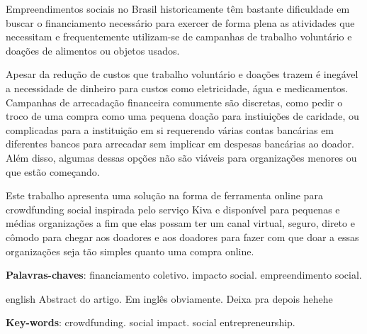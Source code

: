 \begin{resumo}
Empreendimentos sociais no Brasil historicamente têm bastante dificuldade em buscar o financiamento necessário para exercer de forma plena as atividades que necessitam e frequentemente utilizam-se de campanhas de trabalho voluntário e doações de alimentos ou objetos usados.
  
Apesar da redução de custos que trabalho voluntário e doações trazem é inegável a necessidade de dinheiro para custos como eletricidade, água e medicamentos. Campanhas de arrecadação financeira comumente são discretas, como pedir o troco de uma compra como uma pequena doação para instiuições de caridade, ou complicadas para a instituição em si requerendo várias contas bancárias em diferentes bancos para arrecadar sem implicar em despesas bancárias ao doador. Além disso, algumas dessas opções não são viáveis para organizações menores ou que estão começando.

Este trabalho apresenta uma solução na forma de ferramenta online para crowdfunding social inspirada pelo serviço Kiva \cite{flannery2007kiva} e disponível para pequenas e médias organizações a fim que elas possam ter um canal virtual, seguro, direto e cômodo para chegar aos doadores e aos doadores para fazer com que doar a essas organizações seja tão simples quanto uma compra online.

  \vspace{\onelineskip}
  \noindent
  \textbf{Palavras-chaves}: financiamento coletivo. impacto social. empreendimento social.
\end{resumo}

\begin{resumo}[Abstract]
	\begin{otherlanguage*}{english}
		Abstract do artigo. Em inglês obviamente. Deixa pra depois hehehe
        
		\vspace{\onelineskip}
		\noindent
		\textbf{Key-words}: crowdfunding. social impact. social entrepreneurship.
	\end{otherlanguage*}
\end{resumo}